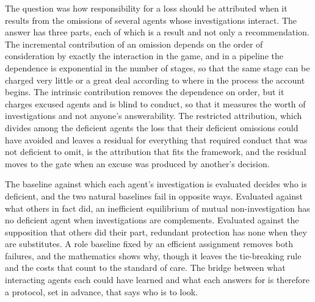 \documentclass[11pt]{article}
\theoremstyle{plain}
\theoremstyle{definition}
\begin{document}
The question was how responsibility for a loss should be attributed when it results from the omissions of several agents whose investigations interact. The answer has three parts, each of which is a result and not only a recommendation. The incremental contribution of an omission depends on the order of consideration by exactly the interaction in the game, and in a pipeline the dependence is exponential in the number of stages, so that the same stage can be charged very little or a great deal according to where in the process the account begins. The intrinsic contribution removes the dependence on order, but it charges excused agents and is blind to conduct, so that it measures the worth of investigations and not anyone's answerability. The restricted attribution, which divides among the deficient agents the loss that their deficient omissions could have avoided and leaves a residual for everything that required conduct that was not deficient to omit, is the attribution that fits the framework, and the residual moves to the gate when an excuse was produced by another's decision.

The baseline against which each agent's investigation is evaluated decides who is deficient, and the two natural baselines fail in opposite ways. Evaluated against what others in fact did, an inefficient equilibrium of mutual non-investigation has no deficient agent when investigations are complements. Evaluated against the supposition that others did their part, redundant protection has none when they are substitutes. A role baseline fixed by an efficient assignment removes both failures, and the mathematics shows why, though it leaves the tie-breaking rule and the costs that count to the standard of care. The bridge between what interacting agents each could have learned and what each answers for is therefore a protocol, set in advance, that says who is to look.
\end{document}
